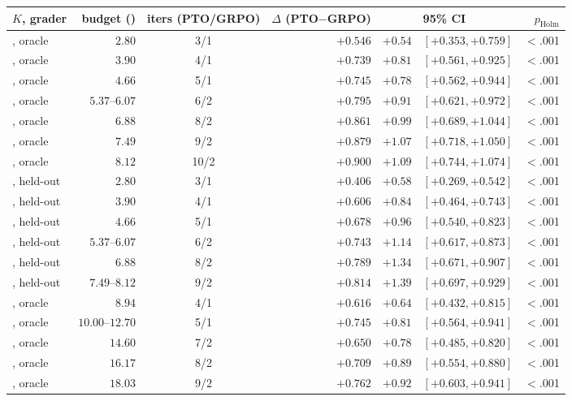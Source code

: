\begin{table}[t]
  \centering\footnotesize
  \setlength{\tabcolsep}{4pt}
  \begin{tabular}{@{}l r c rrlr@{}}
    \toprule
    $K$, grader & budget (\gpuh{}) & iters (PTO/GRPO) & $\Delta$ (PTO$-$GRPO) & \dz{} & 95\% CI & $p_{\text{Holm}}$ \\
    \midrule
\Kz{}, oracle & $2.80$ & 3/1 & $+0.546$ & $+0.54$ & $[+0.353, +0.759]$ & $<$.001 \\
\Kz{}, oracle & $3.90$ & 4/1 & $+0.739$ & $+0.81$ & $[+0.561, +0.925]$ & $<$.001 \\
\Kz{}, oracle & $4.66$ & 5/1 & $+0.745$ & $+0.78$ & $[+0.562, +0.944]$ & $<$.001 \\
\Kz{}, oracle & $5.37$--$6.07$ & 6/2 & $+0.795$ & $+0.91$ & $[+0.621, +0.972]$ & $<$.001 \\
\Kz{}, oracle & $6.88$ & 8/2 & $+0.861$ & $+0.99$ & $[+0.689, +1.044]$ & $<$.001 \\
\Kz{}, oracle & $7.49$ & 9/2 & $+0.879$ & $+1.07$ & $[+0.718, +1.050]$ & $<$.001 \\
\Kz{}, oracle & $8.12$ & 10/2 & $+0.900$ & $+1.09$ & $[+0.744, +1.074]$ & $<$.001 \\
\addlinespace[2pt]
\Kz{}, held-out & $2.80$ & 3/1 & $+0.406$ & $+0.58$ & $[+0.269, +0.542]$ & $<$.001 \\
\Kz{}, held-out & $3.90$ & 4/1 & $+0.606$ & $+0.84$ & $[+0.464, +0.743]$ & $<$.001 \\
\Kz{}, held-out & $4.66$ & 5/1 & $+0.678$ & $+0.96$ & $[+0.540, +0.823]$ & $<$.001 \\
\Kz{}, held-out & $5.37$--$6.07$ & 6/2 & $+0.743$ & $+1.14$ & $[+0.617, +0.873]$ & $<$.001 \\
\Kz{}, held-out & $6.88$ & 8/2 & $+0.789$ & $+1.34$ & $[+0.671, +0.907]$ & $<$.001 \\
\Kz{}, held-out & $7.49$--$8.12$ & 9/2 & $+0.814$ & $+1.39$ & $[+0.697, +0.929]$ & $<$.001 \\
\addlinespace[2pt]
\Kf{}, oracle & $8.94$ & 4/1 & $+0.616$ & $+0.64$ & $[+0.432, +0.815]$ & $<$.001 \\
\Kf{}, oracle & $10.00$--$12.70$ & 5/1 & $+0.745$ & $+0.81$ & $[+0.564, +0.941]$ & $<$.001 \\
\Kf{}, oracle & $14.60$ & 7/2 & $+0.650$ & $+0.78$ & $[+0.485, +0.820]$ & $<$.001 \\
\Kf{}, oracle & $16.17$ & 8/2 & $+0.709$ & $+0.89$ & $[+0.554, +0.880]$ & $<$.001 \\
\Kf{}, oracle & $18.03$ & 9/2 & $+0.762$ & $+0.92$ & $[+0.603, +0.941]$ & $<$.001 \\

\end{tabular}
\end{table}
